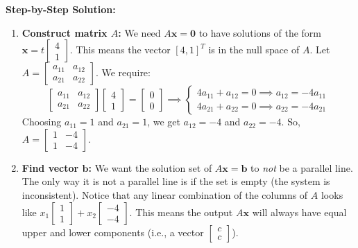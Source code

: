 \documentclass[11pt]{article}
\begin{document}
\textbf{Step-by-Step Solution:}
\begin{enumerate}
    \item \textbf{Construct matrix $A$:} We need $A\mathbf{x} = \mathbf{0}$ to have solutions of the form $\mathbf{x} = t\begin{bmatrix} 4 \\ 1 \end{bmatrix}$. This means the vector $[4, 1]^T$ is in the null space of $A$. 
    Let $A = \begin{bmatrix} a_{11} & a_{12} \\ a_{21} & a_{22} \end{bmatrix}$. We require:
    \[
    \begin{bmatrix} a_{11} & a_{12} \\ a_{21} & a_{22} \end{bmatrix} \begin{bmatrix} 4 \\ 1 \end{bmatrix} = \begin{bmatrix} 0 \\ 0 \end{bmatrix} \implies \begin{cases} 4a_{11} + a_{12} = 0 \implies a_{12} = -4a_{11} \\ 4a_{21} + a_{22} = 0 \implies a_{22} = -4a_{21} \end{cases}
    \]
    Choosing $a_{11} = 1$ and $a_{21} = 1$, we get $a_{12} = -4$ and $a_{22} = -4$.
    So, $A = \begin{bmatrix} 1 & -4 \\ 1 & -4 \end{bmatrix}$.
    \item \textbf{Find vector $\mathbf{b}$:} We want the solution set of $A\mathbf{x} = \mathbf{b}$ to \textit{not} be a parallel line. The only way it is not a parallel line is if the set is empty (the system is inconsistent). 
    Notice that any linear combination of the columns of $A$ looks like $x_1 \begin{bmatrix} 1 \\ 1 \end{bmatrix} + x_2 \begin{bmatrix} -4 \\ -4 \end{bmatrix}$. This means the output $A\mathbf{x}$ will always have equal upper and lower components (i.e., a vector $\begin{bmatrix} c \\ c \end{bmatrix}$). 

\end{enumerate}
\end{document}
